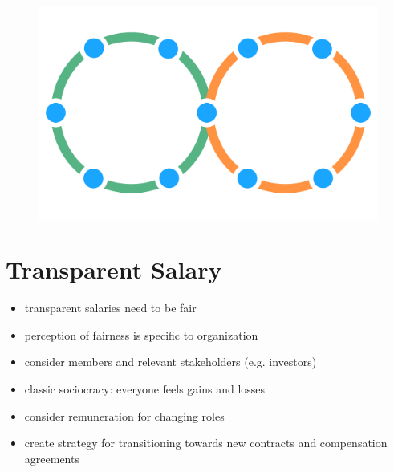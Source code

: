 \begin{figure}[htbp]
\centering
\includegraphics[keepaspectratio,width=\textwidth,height=0.75\textheight]{img/structural-patterns/link.png}
\end{figure}

\section{Transparent Salary}
\label{transparentsalary}

\begin{itemize}
\item transparent salaries need to be fair

\item perception of fairness is specific to organization

\item consider members and relevant stakeholders (e.g. investors)

\item classic sociocracy: everyone feels gains and losses

\item consider remuneration for changing roles

\item create strategy for transitioning towards new contracts and compensation agreements

\end{itemize}

